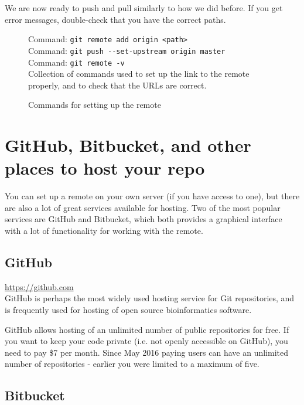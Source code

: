 \documentclass[../main/git_course_main.tex]{subfiles}
\begin{document}
We are now ready to push and pull similarly to how we did before.
If you get error messages, double-check that you have the correct paths.

\begin{figure}[h!]
\begin{bluebox}
Command: \verb$git remote add origin <path>$ \\
Command: \verb$git push --set-upstream origin master$ \\
Command: \verb$git remote -v$ \\

Collection of commands used to set up the link to the remote properly,
and to check that the URLs are correct.
\end{bluebox}
\label{command:pull}
\caption{Commands for setting up the remote}
\end{figure}

\section{GitHub, Bitbucket, and other places to host your repo}

You can set up a remote on your own server (if you have access to one), but there are also
a lot of great services available for hosting. Two of the most popular services are GitHub and Bitbucket, which both provides a graphical interface with a lot of functionality for working with the remote.

\subsection{GitHub}

\url{https://github.com} \\

GitHub is perhaps the most widely used hosting service for Git repositories, and is frequently used for hosting of open source bioinformatics software. 

GitHub allows hosting of an unlimited number of public repositories for free. If you want to keep your code private (i.e. not openly accessible on GitHub), you need to pay \$7 per month. Since May 2016 paying users can have an unlimited number of repositories - earlier you were limited to a maximum of five.

\subsection{Bitbucket}
\end{document}
